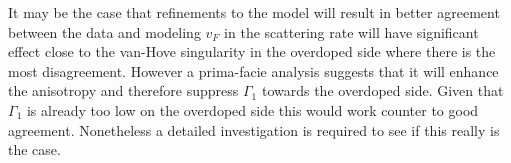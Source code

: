 It may be the case that refinements to the model will result in better agreement between the data and modeling $v_F$ in the scattering rate will have significant effect close to the van-Hove singularity in the overdoped side where there is the most disagreement. However a prima-facie analysis suggests that it will enhance the anisotropy and therefore suppress $\Gamma_1$ towards the overdoped side. Given that $\Gamma_1$ is already too low on the overdoped side this would work counter to good agreement. Nonetheless a detailed investigation is required to see if this really is the case.




